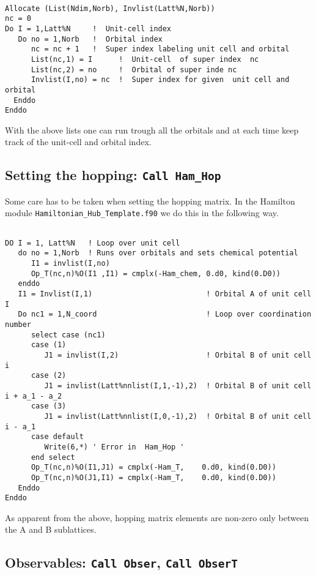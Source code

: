 \begin{lstlisting}

Allocate (List(Ndim,Norb), Invlist(Latt%N,Norb))
nc = 0
Do I = 1,Latt%N     !  Unit-cell index 
   Do no = 1,Norb   !  Orbital index
      nc = nc + 1   !  Super index labeling unit cell and orbital
      List(nc,1) = I      !  Unit-cell  of super index  nc
      List(nc,2) = no     !  Orbital of super inde nc
      Invlist(I,no) = nc  !  Super index for given  unit cell and orbital
  Enddo
Enddo

\end{lstlisting}

With the above lists one can run trough all the orbitals and at each time keep track of the unit-cell and orbital index.  

\subsection{Setting the hopping:  \texttt{Call Ham\_Hop} }

Some care has to be taken when setting the hopping matrix.    In the Hamilton module \texttt{Hamiltonian\_Hub\_Template.f90}   we do this in the following way. 

\begin{lstlisting}

DO I = 1, Latt%N   ! Loop over unit cell 
   do no = 1,Norb  ! Runs over orbitals and sets chemical potential
      I1 = invlist(I,no)  
      Op_T(nc,n)%O(I1 ,I1) = cmplx(-Ham_chem, 0.d0, kind(0.D0))
   enddo
   I1 = Invlist(I,1)                          ! Orbital A of unit cell I
   Do nc1 = 1,N_coord                         ! Loop over coordination  number
      select case (nc1)
      case (1)
         J1 = invlist(I,2)                    ! Orbital B of unit cell i
      case (2)
         J1 = invlist(Latt%nnlist(I,1,-1),2)  ! Orbital B of unit cell i + a_1 - a_2
      case (3)
         J1 = invlist(Latt%nnlist(I,0,-1),2)  ! Orbital B of unit cell i - a_1 
      case default
         Write(6,*) ' Error in  Ham_Hop '  
      end select
      Op_T(nc,n)%O(I1,J1) = cmplx(-Ham_T,    0.d0, kind(0.D0))   
      Op_T(nc,n)%O(J1,I1) = cmplx(-Ham_T,    0.d0, kind(0.D0))
   Enddo
Enddo

\end{lstlisting}
As apparent from the above, hopping matrix elements   are non-zero only between the A and B  sublattices. 


\subsection{Observables:  \texttt{Call Obser},   \texttt{Call ObserT}}

